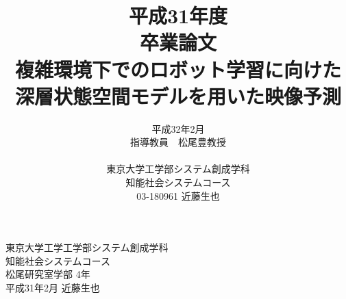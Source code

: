 \documentclass[a4paper,12pt,oneside,openany,dvipdfmx]{jsbook}
\title{
    平成31年度\\
    卒業論文\\
    複雑環境下でのロボット学習に向けた\\
    深層状態空間モデルを用いた映像予測
}
\author{
    平成32年2月\\
    指導教員　松尾豊教授\\
    \\
    東京大学工学部システム創成学科\\
    知能社会システムコース\\
    03-180961 近藤生也
}
\date{}
\begin{document}
\maketitle
\pagestyle{plain}
\setlength{\baselineskip}{22truept}
\frontmatter

\setcounter{tocdepth}{2}
\tableofcontents
\listoffigures
\listoftables
\mainmatter









\begin{flushright}
東京大学工学工学部システム創成学科\\
知能社会システムコース\\
松尾研究室学部 4年\\
平成31年2月 近藤生也\\
\end{flushright}

\end{document}
